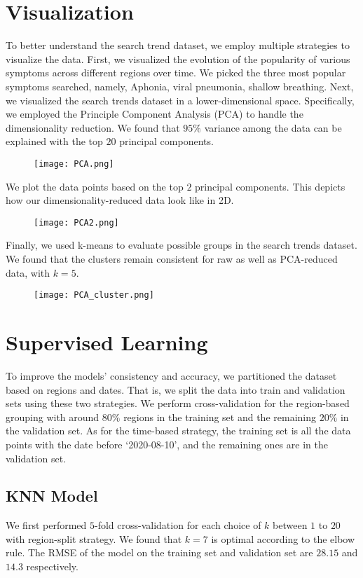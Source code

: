\documentclass[journal,11pt]{IEEEtran}
\begin{document}
\section{Visualization}
To better understand the search trend dataset, we employ multiple strategies to visualize the data. First, we visualized the evolution of the popularity of various symptoms across different regions over time. We picked the three most popular symptoms searched, namely, Aphonia, viral pneumonia, shallow breathing. Next, we visualized the search trends dataset in a lower-dimensional space. Specifically, we employed the Principle Component Analysis (PCA) to handle the dimensionality reduction. We found that $95\%$ variance among the data can be explained with the top $20$ principal components. 
\begin{figure}[H]%
\begin {center}
\texttt{[image: PCA.png]}
\label{fig:ecg}
\end {center}
\end{figure}
We plot the data points based on the top $2$ principal components. This depicts how our dimensionality-reduced data look like in 2D. 
\begin{figure}[H]%
\begin {center}
\texttt{[image: PCA2.png]}
\label{fig:ecg}
\end {center}
\end{figure}
Finally, we used k-means to evaluate possible groups in the search trends dataset. We found that the clusters remain consistent for raw as well as PCA-reduced data, with $k=5$. 
\begin{figure}[H]%
\begin {center}
\texttt{[image: PCA\_cluster.png]}
\label{fig:ecg}
\end {center}
\end{figure}

\section{Supervised Learning}
To improve the models' consistency and accuracy, we partitioned the dataset based on regions and dates. That is, we split the data into train and validation sets using these two strategies. We perform cross-validation for the region-based grouping with around $80\%$ regions in the training set and the remaining $20\%$ in the validation set. As for the time-based strategy, the training set is all the data points with the date before `2020-08-10', and the remaining ones are in the validation set.
\begin{center}
    \subsection{KNN Model}
\end{center}
\indent \indent We first performed $5$-fold cross-validation for each choice of $k$ between $1$ to $20$ with region-split strategy. We found that $k=7$ is optimal according to the elbow rule. The RMSE of the model on the training set and validation set are $28.15$ and $14.3$ respectively. 
\end{document}
